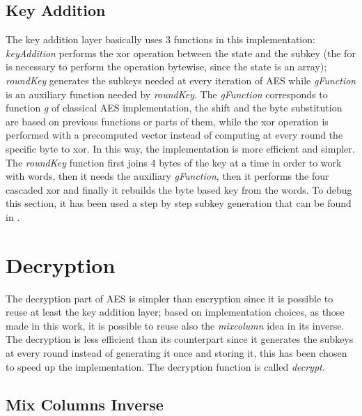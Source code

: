 \documentclass{article}
\begin{document}
\subsection{Key Addition}

The key addition layer basically uses 3 functions in this implementation: \textit{keyAddition} performs the xor operation between the state and the subkey (the for is necessary to perform the operation bytewise, since the state is an array); \textit{roundKey} generates the subkeys needed at every iteration of AES while \textit{gFunction} is an auxiliary function needed by \textit{roundKey}. \newline
The \textit{gFunction} corresponds to function \textit{g} of classical AES implementation, the shift and the byte substitution are based on previous functions or parts of them, while the xor operation is performed with a precomputed vector instead of computing at every round the specific byte to xor. In this way, the implementation is more efficient and simpler.\newline
The \textit{roundKey} function first joins 4 bytes of the key at a time in order to work with words, then it needs the auxiliary \textit{gFunction}, then it performs the four cascaded xor and finally it rebuilds the byte based key from the words.\newline
To debug this section, it has been used a step by step subkey generation that can be found in \cite{AESsteps}.   


\section{Decryption}

The decryption part of AES is simpler than encryption since it is possible to reuse at least the key addition layer; based on implementation choices, as those made in this work, it is possible to reuse also the \textit{mixcolumn} idea in its inverse. The decryption is less efficient than its counterpart since it generates the subkeys at every round instead of generating it once and storing it, this has been chosen to speed up the implementation. The decryption function is called \textit{decrypt}.
 
\subsection{Mix Columns Inverse}
\end{document}
